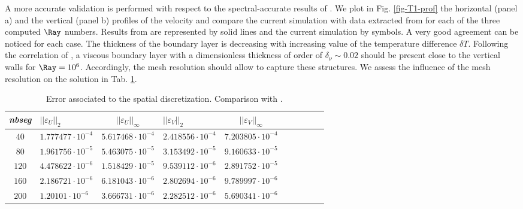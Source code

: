 A more accurate validation is performed with respect to the spectral-accurate results of \cite{LeQuere91}.
We plot in Fig. \ref{fig-T1-prof} the horizontal (panel a) and the vertical (panel b)  profiles of the velocity and compare the current simulation with data extracted from  \cite{LeQuere91} for each of the three computed $\Ray$ numbers.
Results from \cite{LeQuere91} are represented by solid lines and the current simulation by symbols.
A very good agreement can  be noticed for each case.
The thickness of the boundary layer is decreasing with increasing value of the temperature difference $\delta T$.
Following the correlation of \cite{bejan2013convection}, a viscous boundary layer with a dimensionless thickness of order of $\delta_\nu \sim 0.02$ should be present close to the vertical walls for $\Ray = 10^6$.
Accordingly, the mesh resolution should allow to capture these structures.
We assess the influence of the mesh resolution on the solution in Tab. \ref{tab-mesh-conv-analysis}. 
\begin{table}[h!]
   \begin{center}
      \begin{tabular}{*{5}{cl}}
         
        {\em nbseg} &  $|| \varepsilon_U ||_{2}$ & $|| \varepsilon_U ||_{\infty}$ & $|| \varepsilon_V ||_{2}$ & $|| \varepsilon_V ||_{\infty}$ \\ \toprule
        $40$ & $1.777477 \cdot 10^{-4}$ & $5.617468 \cdot 10^{-4}$ & $2.418556 \cdot 10^{-4}$ & $7.203805 \cdot 10^{-4}$ \\
        $80$ & $1.961756 \cdot 10^{-5}$ & $5.463075 \cdot 10^{-5}$ & $3.153492 \cdot 10^{-5}$ & $9.160633 \cdot 10^{-5}$ \\
        $120$ & $4.478622 \cdot 10^{-6}$ & $1.518429 \cdot 10^{-5}$ & $9.539112 \cdot 10^{-6}$ & $2.891752 \cdot 10^{-5}$ \\
        $160$ & $2.186721 \cdot 10^{-6}$ & $6.181043 \cdot 10^{-6}$ & $2.802694 \cdot 10^{-6}$ & $9.789997 \cdot 10^{-6}$ \\
        $200$ & $1.20101 \cdot 10^{-6}$ & $3.666731 \cdot 10^{-6}$ & $2.282512 \cdot 10^{-6}$ & $5.690341 \cdot 10^{-6}$ \\
        
      \end{tabular}
   \end{center}
   \caption{Error associated to the spatial discretization. Comparison with \cite{LeQuere91}.}
   \label{tab-mesh-conv-analysis}
\end{table}

